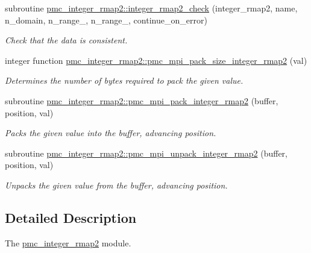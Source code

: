 \begin{DoxyCompactItemize}
subroutine \mbox{\hyperlink{namespacepmc__integer__rmap2_a2e4c3d69cb5dbe25f73b328fc08a4c71}{pmc\+\_\+integer\+\_\+rmap2\+::integer\+\_\+rmap2\+\_\+check}} (integer\+\_\+rmap2, name, n\+\_\+domain, n\+\_\+range\+\_, n\+\_\+range\+\_, continue\+\_\+on\+\_\+error)
\begin{DoxyCompactList}\small\item\em Check that the data is consistent. \end{DoxyCompactList}\item 
integer function \mbox{\hyperlink{namespacepmc__integer__rmap2_a31c142e859b51a8e5a68cd40635c3dff}{pmc\+\_\+integer\+\_\+rmap2\+::pmc\+\_\+mpi\+\_\+pack\+\_\+size\+\_\+integer\+\_\+rmap2}} (val)
\begin{DoxyCompactList}\small\item\em Determines the number of bytes required to pack the given value. \end{DoxyCompactList}\item 
subroutine \mbox{\hyperlink{namespacepmc__integer__rmap2_a10ff7b71918c4a8e48febe2cffe0fbe6}{pmc\+\_\+integer\+\_\+rmap2\+::pmc\+\_\+mpi\+\_\+pack\+\_\+integer\+\_\+rmap2}} (buffer, position, val)
\begin{DoxyCompactList}\small\item\em Packs the given value into the buffer, advancing position. \end{DoxyCompactList}\item 
subroutine \mbox{\hyperlink{namespacepmc__integer__rmap2_a803859f2ba244b1035bba011911a1b31}{pmc\+\_\+integer\+\_\+rmap2\+::pmc\+\_\+mpi\+\_\+unpack\+\_\+integer\+\_\+rmap2}} (buffer, position, val)
\begin{DoxyCompactList}\small\item\em Unpacks the given value from the buffer, advancing position. \end{DoxyCompactList}\end{DoxyCompactItemize}


\subsection{Detailed Description}
The \mbox{\hyperlink{namespacepmc__integer__rmap2}{pmc\+\_\+integer\+\_\+rmap2}} module. 

